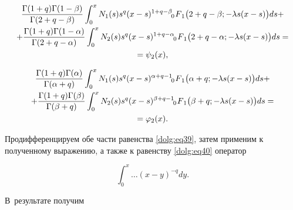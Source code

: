 \begin{multline}

\label{dolg:eq39}

\frac{\Gamma(1+q)\Gamma(1-\beta)}{\Gamma(2+q-\beta)} \int _0^x N_1(s) s^{q} (x-s)^{1+q-\beta}  \,\,

F_{\hspace{-4mm}0 \hspace{3mm}1} \bigl(2+q-\beta;-\lambda s (x-s)\bigr) ds +

\\

+\frac{\Gamma(1+q)\Gamma(1-\alpha)}{\Gamma(2+q-\alpha)} \int _0^x N_2(s) s^{q} (x-s)^{1+q-\alpha}  \,\,

F_{\hspace{-4mm}0 \hspace{3mm}1} \bigl(2+q-\alpha;-\lambda s (x-s)\bigr) ds = \\

= \psi_2(x),

\end{multline}

\begin{multline}

\label{dolg:eq40}

\frac{\Gamma(1+q)\Gamma(\alpha)}{\Gamma(\alpha+q)} \int _0^x N_1(s) s^{q} (x-s)^{\alpha+q-1}  \,\,

F_{\hspace{-4mm}0 \hspace{3mm}1} \bigl(\alpha+q;-\lambda s (x-s)\bigr) ds +

\\

+\frac{\Gamma(1+q)\Gamma(\beta)}{\Gamma(\beta+q)} \int _0^x N_2(s) s^{q} (x-s)^{\beta+q-1}  \,\,

F_{\hspace{-4mm}0 \hspace{3mm}1} \bigl(\beta+q;-\lambda s (x-s)\bigr) ds =

\\ = \varphi_2(x).

\end{multline}



Продифференцируем обе части равенства \eqref{dolg:eq39}, затем применим к полученному выражению, а также к равенству \eqref{dolg:eq40} оператор 

$$\int _0^x \dots (x-y)^{-q} dy.$$ 

В~результате получим

